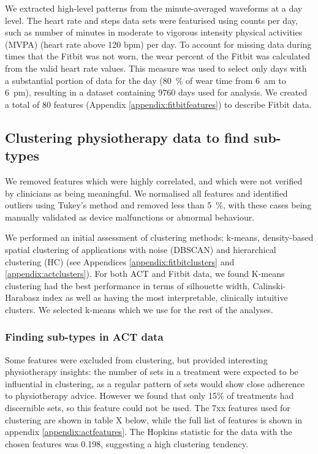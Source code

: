 \documentclass{article}
\begin{document}
We extracted high-level patterns from the minute-averaged waveforms at a day level. The heart rate and steps data sets were featurised using counts per day, such as number of minutes in moderate to vigorous intensity physical activities (MVPA) (heart rate above 120 bpm) per day. To account for missing data during times that the Fitbit was not worn, the wear percent of the Fitbit was calculated from the valid heart rate values. This measure was used to select only days with a substantial portion of data for the day (80~\% of wear time from 6~am to 6~pm), resulting in a dataset containing 9760 days used for analysis.  We created a total of 80 features (Appendix \ref{appendix:fitbitfeatures}) to describe Fitbit data. 

\subsection{Clustering physiotherapy data to find sub-types}  

We removed features which were highly correlated, and which were not verified by clinicians as being meaningful. We normalised all features and identified outliers using Tukey's method and removed less than 5~\%, with these cases being manually validated as device malfunctions or abnormal behaviour.  

We performed an initial assessment of clustering methods:  k-means, density-based spatial clustering of applications with noise (DBSCAN) and hierarchical clustering (HC) (see Appendices \ref{appendix:fitbitclusters} and \ref{appendix:actclusters}). For both ACT and Fitbit data, we found K-means clustering had the best performance in terms of silhouette width, Calinski-Harabasz index as well as having the most interpretable, clinically intuitive clusters. We selected k-means which we use for the rest of the analyses.

\subsubsection{Finding sub-types in ACT data}

Some features were excluded from clustering, but provided interesting physiotherapy insights: the number of sets in a treatment were expected to be influential in clustering, as a regular pattern of sets would show close adherence to physiotherapy advice. However we found that only 15\% of treatments had discernible sets, so this feature could not be used. The 7xx features used for clustering are shown in table X below, while the full list of features is shown in appendix \ref{appendix:actfeatures}. The Hopkins statistic for the data with the chosen features was 0.198, suggesting a high clustering tendency. 
\end{document}
